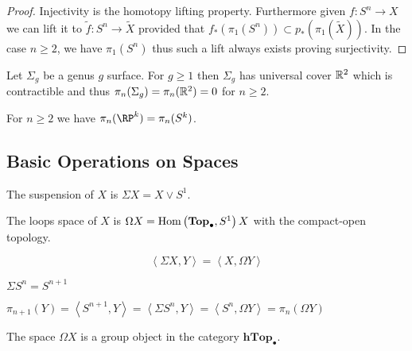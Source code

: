 \documentclass[12pt]{extarticle}
\begin{document}
\begin{proof}
Injectivity is the homotopy lifting property. Furthermore given $f : S^n \to X$ we can lift it to $\tilde{f} : S^n \to \tilde{X}$ provided that $f_*(\pi_1(S^n)) \subset p_*(\pi_1(\tilde{X}))$. In the case $n \ge 2$, we have $\pi_1(S^n)$ thus such a lift always exists proving surjectivity. 
\end{proof}

\begin{example}
Let $\Sigma_g$ be a genus $g$ surface. For $g \ge 1$ then $\Sigma_g$ has universal cover $\mathbb{R}^2$ which is contractible and thus $\pi_n(\Sigma_g) = \pi_n(\mathbb{R}^2) = 0$ for $n \ge 2$. 
\end{example}

\begin{example}
For $n \ge 2$ we have $\pi_n(\RP^k) = \pi_n(S^k)$. 
\end{example}

\subsection{Basic Operations on Spaces}

\begin{definition}
The suspension of $X$ is $\Sigma X = X \vee S^1$.
\end{definition}

\begin{definition}
The loops space of $X$ is $\Omega X = \mathrm{Hom}\left( \mathbf{Top}_\bullet, S^1 \right){X}$ with the compact-open topology. 
\end{definition}

\begin{theorem}[Adjunction]
\[ \left< \Sigma X, Y \right> = \left< X, \Omega Y \right> \]
\end{theorem}

\begin{example}
$\Sigma S^n = S^{n + 1}$
\end{example}

\begin{proposition}
$\pi_{n+1}(Y) = \left< S^{n+1}, Y \right> = \left< \Sigma S^n, Y \right> = \left< S^n, \Omega Y \right> = \pi_n(\Omega Y)$
\end{proposition}

\begin{proposition}
The space $\Omega X$ is a group object in the category $\mathbf{hTop}_\bullet$. 
\end{proposition}
\end{document}
